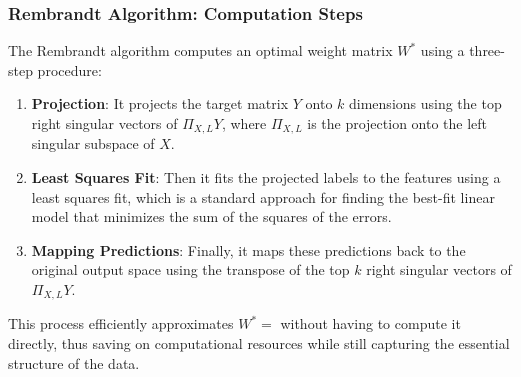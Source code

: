 \documentclass{beamer}
\begin{document}

\begin{frame}
\frametitle{Rembrandt Algorithm: Computation Steps}
The Rembrandt algorithm computes an optimal weight matrix \( W^* \) using a three-step procedure:

\begin{enumerate}
    \item \textbf{Projection}: It projects the target matrix \( Y \) onto \( k \) dimensions using the top right singular vectors of \( \Pi_{X,L} Y \), where \( \Pi_{X,L} \) is the projection onto the left singular subspace of \( X \).
    \item \textbf{Least Squares Fit}: Then it fits the projected labels to the features using a least squares fit, which is a standard approach for finding the best-fit linear model that minimizes the sum of the squares of the errors.
    \item \textbf{Mapping Predictions}: Finally, it maps these predictions back to the original output space using the transpose of the top \( k \) right singular vectors of \( \Pi_{X,L} Y \).
\end{enumerate}

This process efficiently approximates \( W^* =  \) without having to compute it directly, thus saving on computational resources while still capturing the essential structure of the data.
\end{frame}

\end{document}
